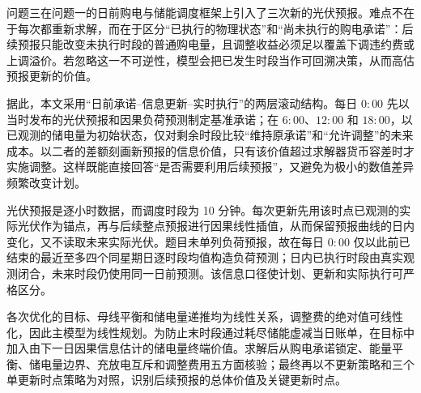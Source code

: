 问题三在问题一的日前购电与储能调度框架上引入了三次新的光伏预报。难点不在于每次都重新求解，而在于区分“已执行的物理状态”和“尚未执行的购电承诺”：后续预报只能改变未执行时段的普通购电量，且调整收益必须足以覆盖下调违约费或上调溢价。若忽略这一不可逆性，模型会把已发生时段当作可回溯决策，从而高估预报更新的价值。

据此，本文采用“日前承诺--信息更新--实时执行”的两层滚动结构。每日 $0{:}00$ 先以当时发布的光伏预报和因果负荷预测制定基准承诺；在 $6{:}00$、$12{:}00$ 和 $18{:}00$，以已观测的储电量为初始状态，仅对剩余时段比较“维持原承诺”和“允许调整”的未来成本。以二者的差额刻画新预报的信息价值，只有该价值超过求解器货币容差时才实施调整。这样既能直接回答“是否需要利用后续预报”，又避免为极小的数值差异频繁改变计划。

光伏预报是逐小时数据，而调度时段为 10 分钟。每次更新先用该时点已观测的实际光伏作为锚点，再与后续整点预报进行因果线性插值，从而保留预报曲线的日内变化，又不读取未来实际光伏。题目未单列负荷预报，故在每日 $0{:}00$ 仅以此前已结束的最近至多四个同星期日逐时段均值构造负荷预测；日内已执行时段由真实观测闭合，未来时段仍使用同一日前预测。该信息口径使计划、更新和实际执行可严格区分。

各次优化的目标、母线平衡和储电量递推均为线性关系，调整费的绝对值可线性化，因此主模型为线性规划。为防止末时段通过耗尽储能虚减当日账单，在目标中加入由下一日因果信息估计的储电量终端价值。求解后从购电承诺锁定、能量平衡、储电量边界、充放电互斥和调整费用五方面核验；最终再以不更新策略和三个单更新时点策略为对照，识别后续预报的总体价值及关键更新时点。
